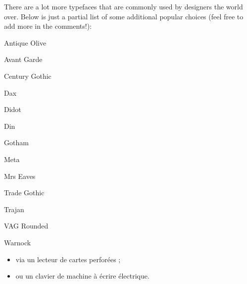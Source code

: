 \documentclass[12pt,a4paper,twocolumn]{book} %
\begin{document}
There are a lot more typefaces that are commonly used by designers the world over. Below is just a partial list of some additional popular choices (feel free to add more in the comments!):

Antique Olive



Avant Garde



Century Gothic



Dax



Didot



Din



Gotham



Meta



Mrs Eaves



Trade Gothic



Trajan



VAG Rounded



Warnock





\begin{itemize}
\item  via un lecteur de cartes perforées ;
\item  ou un clavier de machine à écrire électrique.
\end{itemize}
\end{document}
